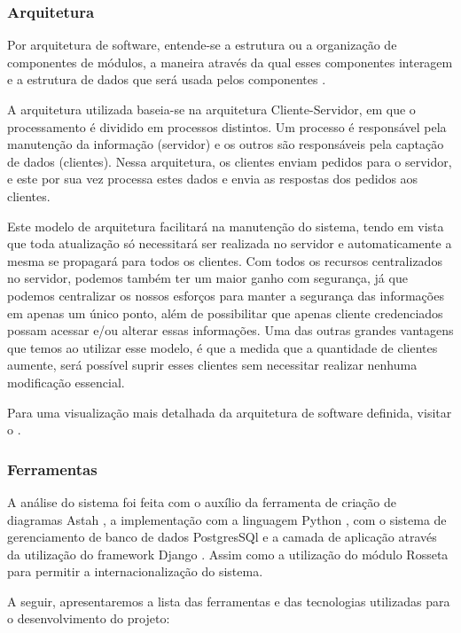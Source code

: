 \subsubsection{Arquitetura}
Por arquitetura de software, entende-se a estrutura ou a organização de componentes de módulos, a maneira através da qual esses componentes interagem e a estrutura de dados que será usada pelos componentes \cite{pressman2006engenharia}.

A arquitetura utilizada baseia-se na arquitetura Cliente-Servidor\cite{david2013everything}, em que o processamento é dividido em processos distintos. Um processo é responsável pela manutenção da 
informação (servidor) e os outros são responsáveis pela captação de dados (clientes). Nessa arquitetura, os clientes enviam pedidos para o servidor, e este por sua vez processa estes dados e envia as 
respostas dos pedidos aos clientes.

Este modelo de arquitetura facilitará na manutenção do sistema, tendo em vista que toda atualização só necessitará ser realizada no servidor e automaticamente a mesma se propagará para todos os clientes. Com todos os recursos centralizados no servidor, podemos também ter um maior ganho com segurança, já que podemos centralizar os nossos esforços para manter a segurança das informações em apenas um único ponto, além de possibilitar que apenas cliente credenciados possam acessar e/ou alterar essas informações. Uma das outras grandes vantagens que temos  ao utilizar esse modelo, é que a medida que a quantidade de clientes aumente, será possível suprir esses clientes sem necessitar realizar nenhuma modificação essencial.

Para uma visualização mais detalhada da arquitetura de software definida, visitar o  .

\subsubsection{Ferramentas}

 A análise do sistema foi feita com o auxílio da ferramenta de criação de diagramas Astah \cite{astah2016}, a implementação com a linguagem Python \cite{vanrossum2010python}, com o sistema de gerenciamento de banco de dados PostgresSQl \cite{momjian2001postgresql} e a camada de aplicação através da utilização do framework Django \cite{django2016}. Assim como a utilização do módulo Rosseta \cite{rosetta2016} para permitir a internacionalização do sistema.
 
A seguir, apresentaremos a lista das ferramentas e das tecnologias utilizadas para o desenvolvimento do projeto:

